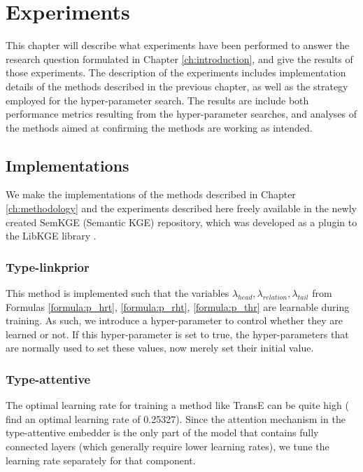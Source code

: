 \chapter{Experiments}
\label{ch:experiments}
This chapter will describe what experiments have been performed to answer the research question formulated in Chapter \ref{ch:introduction}, and give the results of those experiments.
%
The description of the experiments includes implementation details of the methods described in the previous chapter, as well as the strategy employed for the hyper-parameter search.
%
The results are include both performance metrics resulting from the hyper-parameter searches, and  analyses of the methods aimed at confirming the methods are working as intended.

\section{Implementations}
We make the implementations of the methods described in Chapter \ref{ch:methodology} and the experiments described here freely available in the newly created SemKGE (Semantic KGE) repository, which was developed as a plugin to the LibKGE library  .

\subsection{Type-linkprior}
This method is implemented such that the variables $\lambda_{head}, \lambda_{relation}, \lambda_{tail}$ from Formulas \ref{formula:p_hrt}, \ref{formula:p_rht}, \ref{formula:p_thr} are learnable during training. As such, we introduce a hyper-parameter to control whether they are learned or not. If this hyper-parameter is set to true, the hyper-parameters that are normally used to set these values, now merely set their initial value.

%

\subsection{Type-attentive}
The optimal learning rate for training a method like TransE can be quite high (\citeauthor{ruffinelli_you_2019} find an optimal learning rate of 0.25327).
Since the attention mechanism in the type-attentive embedder is the only part of the model that contains fully connected layers (which generally require lower learning rates), we tune the learning rate separately for that component. 


